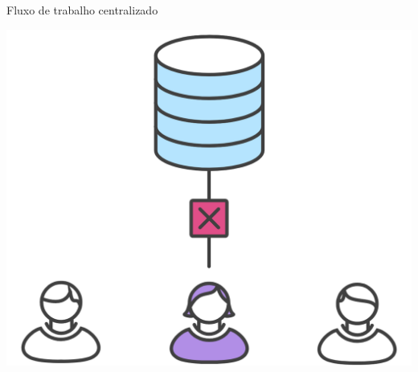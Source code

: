 \documentclass[aspectratio=169]{beamer} %
\begin{document}
\begin{SliTC}{Fluxo de trabalho centralizado}
\begin{itemize}


    \begin{itemize}
    
    
    \end{itemize}

\end{itemize}

\begin{center}
    \includegraphics[scale=.2]{img/git-fluxo-centralizado-conflito5.png}
\end{center}


\end{SliTC}
\end{document}
